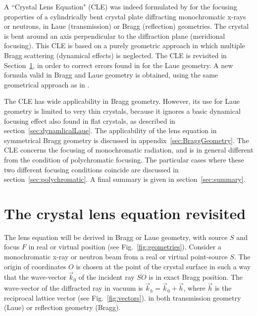 \documentclass[preprint]{iucr}              %
\newcommand{\inred}[1]{{\color{red}#1}}
\begin{document}

A ``Crystal Lens Equation" (CLE) was indeed formulated by \cite{CK} for the focusing properties of a cylindrically bent crystal plate diffracting monochromatic x-rays or neutrons, in Laue (transmission) or Bragg (reflection) geometries. The crystal is bent around an axis perpendicular to the diffraction plane (meridional focusing). This CLE is based on a purely geometric approach in which multiple \inred{Bragg} scattering (dynamical effects) \inred{is neglected}. 
The CLE is \inred{revisited} in Section~\ref{sec:CLE}, \inred{in order to correct errors} found in \cite{CK} for the Laue geometry. \inred{A new formula valid in Bragg and Laue geometry is obtained, using the same geometrical approach as in \cite{CK}}.

The CLE has wide applicability in Bragg geometry. However, \inred{its use for Laue geometry} is \inred{limited to very thin crystals, because
it ignores} a \inred{basic} dynamical focusing effect \inred{also found in flat crystals},
as described in section~\ref{sec:dynamlicalLaue}. 
The \inred{applicability} of the lens equation in symmetrical Bragg geometry is discussed in \inred{appendix}~\ref{sec:BraggGeometry}. %
The CLE concerns the focusing of monochromatic radiation, and is in general different from the condition of polychromatic focusing. The particular cases where these two different focusing conditions coincide are discussed in section~\ref{sec:polychromatic}. A final summary is given in section~\ref{sec:summary}.   


\section{The crystal lens equation revisited}
\label{sec:CLE}

\inred{The lens equation will be derived in Bragg or Laue geometry, with source $S$ and focus $F$ in real or virtual position (see Fig.~\ref{fig:geometries}).} Consider a monochromatic x-ray or neutron beam \inred{from a real or virtual} point-source $S$. The origin of coordinates $O$ is chosen at the point of the crystal surface in such a way that the wave-vector  ${\vec k_0}$ of the incident ray $\overline{SO}$ is in exact Bragg  position. The \inred{wave-vector of the} diffracted ray \inred{in vacuum is } 
$\vec k_h = \vec k_0 + \vec h$, where $\vec h$ is the reciprocal lattice vector (see Fig.~\ref{fig:vectors}).
\inred{in} both transmission geometry (Laue) or reflection geometry (Bragg).
\end{document}
